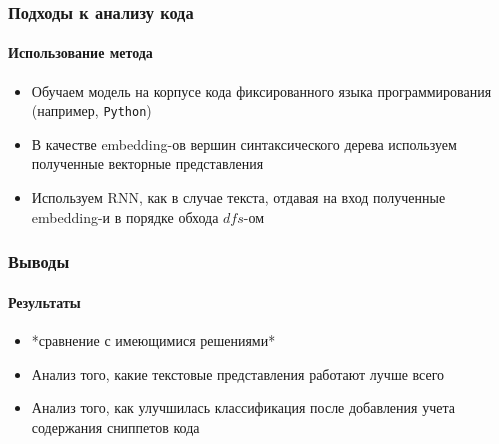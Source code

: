 \documentclass[10pt]{beamer}
\begin{document}

\begin{frame}
\frametitle{Подходы к анализу кода}
\framesubtitle{Использование метода}

\begin{itemize}
	\item Обучаем модель на корпусе кода фиксированного языка программирования (например, \texttt{Python})
	\item В качестве embedding-ов вершин синтаксического дерева используем полученные векторные представления 
	\item Используем RNN, как в случае текста, отдавая на вход полученные embedding-и в порядке обхода $dfs$-ом
\end{itemize}

\end{frame}


\begin{frame}
\frametitle{Выводы}
\framesubtitle{Результаты}

\begin{itemize}
	\item *сравнение с имеющимися решениями*
	\item Анализ того, какие текстовые представления работают лучше всего
	\item Анализ того, как улучшилась классификация после добавления учета содержания сниппетов кода
\end{itemize}

\end{frame}
\end{document}
